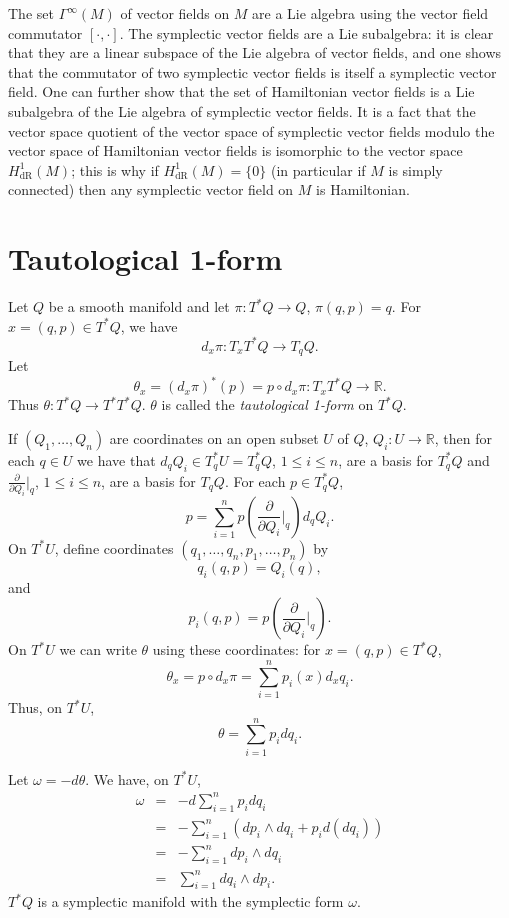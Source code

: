 \documentclass{article}
\begin{document}
The set $\Gamma^\infty(M)$ of vector fields on $M$ are a Lie algebra using the vector field commutator $[\cdot,\cdot]$. The symplectic vector fields
are a Lie subalgebra: it is clear that they are a linear subspace of the Lie algebra of vector fields, and one shows that the commutator
of two symplectic vector fields is itself a symplectic vector field. One can further show that the set of Hamiltonian vector fields is a Lie subalgebra
of the Lie algebra of symplectic vector fields. It is a fact that the vector space quotient of the vector space of symplectic vector fields modulo the vector space
of Hamiltonian vector
fields is isomorphic to the vector space $H_{\textrm{dR}}^1(M)$; this is why if $H_{\textrm{dR}}^1(M)=\{0\}$ (in particular if $M$ is simply connected) then any symplectic vector field on $M$ is Hamiltonian.

\section{Tautological 1-form}
Let $Q$ be a smooth manifold and let $\pi:T^*Q \to Q$, $\pi(q,p)=q$. For $x=(q,p) \in T^*Q$, we have
\[
d_x \pi: T_x T^* Q \to T_q Q.
\]
Let
\[
\theta_x = (d_x \pi)^* (p)=p \circ d_x \pi: T_x T^* Q  \to \mathbb{R}.
\]
Thus $\theta: T^*Q \to T^*T^*Q$.  $\theta$ is called the {\em tautological 1-form} on $T^*Q$. 

If $(Q_1,\ldots,Q_n)$ are coordinates on an open subset $U$ of $Q$, $Q_i:U \to \mathbb{R}$, then for each $q \in U$ we
have that $d_q Q_i \in T_q^*U=T_q^* Q$, $1 \leq i \leq n$, are a basis for $T_q^* Q$ and $\frac{\partial}{\partial Q_i}\big|_q$, $1 \leq i \leq n$, are a basis for $T_qQ$. For each $p \in T_q^* Q$,
\[
p=\sum_{i=1}^n p\left(\frac{\partial}{\partial Q_i}\Big|_q \right) d_q Q_i.
\] 
On $T^*U$, define coordinates $(q_1,\ldots,q_n,p_1,\ldots,p_n)$ by 
\[
q_i(q,p)=Q_i(q),
\]
and
\[
p_i(q,p)=p\left(\frac{\partial}{\partial Q_i}\Big|_q \right).
\]
On $T^*U$ we can
write $\theta$ using these coordinates: for $x=(q,p) \in T^*Q$,
\[
\theta_x = p \circ d_x \pi = \sum_{i=1}^n p_i(x) d_x q_i.
\]
Thus, on $T^*U$,
\[
\theta=\sum_{i=1}^n p_i dq_i.
\]

Let $\omega=-d\theta$. We have, on $T^*U$,
\begin{eqnarray*}
\omega&=&-d \sum_{i=1}^n p_i dq_i\\
&=&-\sum_{i=1}^n \left(dp_i \wedge dq_i +  p_i d(dq_i) \right)\\
&=&-\sum_{i=1}^n dp_i \wedge dq_i\\
&=&\sum_{i=1}^n dq_i \wedge dp_i.
\end{eqnarray*}
$T^*Q$ is a symplectic manifold with the symplectic form $\omega$.
\end{document}
